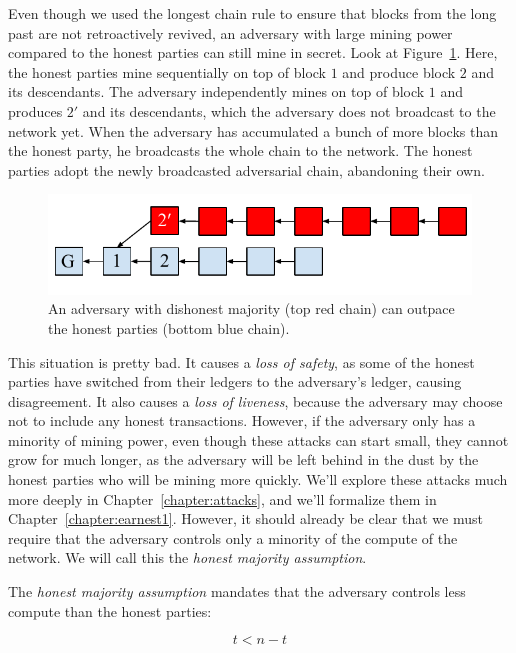 Even though we used the longest chain rule to ensure that blocks from the long past are not
retroactively revived, an adversary with large mining power compared to the honest parties can
still mine in secret. Look at Figure~\ref{fig.adversarial-majority}. Here, the honest parties
mine sequentially on top of block $1$ and produce block $2$ and its descendants.
The adversary independently mines on top of block $1$ and produces $2'$ and its descendants,
which the adversary does not broadcast to the network yet. When the adversary has accumulated
a bunch of more blocks than the honest party, he broadcasts the whole chain to the network.
The honest parties adopt the newly broadcasted adversarial chain, abandoning their own.

\begin{figure}[h]
    \centering
    \includegraphics[width=0.6 \columnwidth,keepaspectratio]{figures/adversarial-majority.pdf}
    \caption{An adversary with dishonest majority (top red chain) can outpace the honest parties (bottom
             blue chain).}
    \label{fig.adversarial-majority}
\end{figure}

This situation is pretty bad. It causes a \emph{loss of safety}, as some of the honest parties have
switched from their ledgers to the adversary's ledger, causing disagreement. It also causes a
\emph{loss of liveness}, because the adversary may choose not to include any honest transactions.
However, if the adversary
only has a minority of mining power, even though these attacks can start small, they cannot grow
for much longer, as the adversary will be left behind in the dust by the honest parties who will
be mining more quickly.
We'll explore these attacks much more deeply in Chapter~\ref{chapter:attacks},
and we'll formalize them in Chapter~\ref{chapter:earnest1}. However, it should already be clear
that we must require that the adversary controls only a minority of the compute of the network.
We will call this the \emph{honest majority assumption}.

\begin{definition}
  The \emph{honest majority assumption} mandates that the adversary controls less compute than
  the honest parties:

  \[
    t < n - t
  \]
\end{definition}

